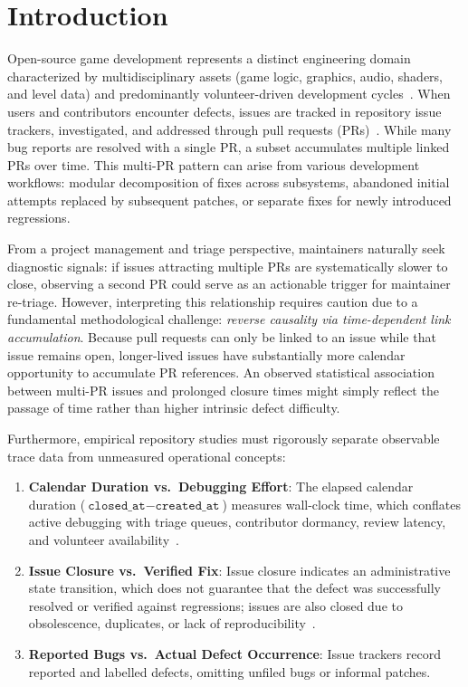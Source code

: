 \section{Introduction}\label{sec:intro}

Open-source game development represents a distinct engineering domain characterized by multidisciplinary assets (game logic, graphics, audio, shaders, and level data) and predominantly volunteer-driven development cycles~\cite{marsad2026ossgamebench}. When users and contributors encounter defects, issues are tracked in repository issue trackers, investigated, and addressed through pull requests (PRs)~\cite{gousios2014pull}. While many bug reports are resolved with a single PR, a subset accumulates multiple linked PRs over time. This multi-PR pattern can arise from various development workflows: modular decomposition of fixes across subsystems, abandoned initial attempts replaced by subsequent patches, or separate fixes for newly introduced regressions.

From a project management and triage perspective, maintainers naturally seek diagnostic signals: if issues attracting multiple PRs are systematically slower to close, observing a second PR could serve as an actionable trigger for maintainer re-triage. However, interpreting this relationship requires caution due to a fundamental methodological challenge: \emph{reverse causality via time-dependent link accumulation}. Because pull requests can only be linked to an issue while that issue remains open, longer-lived issues have substantially more calendar opportunity to accumulate PR references. An observed statistical association between multi-PR issues and prolonged closure times might simply reflect the passage of time rather than higher intrinsic defect difficulty.

Furthermore, empirical repository studies must rigorously separate observable trace data from unmeasured operational concepts:
\begin{enumerate}
  \item \textbf{Calendar Duration vs.\ Debugging Effort}: The elapsed calendar duration ($\texttt{closed\_at} - \texttt{created\_at}$) measures wall-clock time, which conflates active debugging with triage queues, contributor dormancy, review latency, and volunteer availability~\cite{mockus2002two}.
  \item \textbf{Issue Closure vs.\ Verified Fix}: Issue closure indicates an administrative state transition, which does not guarantee that the defect was successfully resolved or verified against regressions; issues are also closed due to obsolescence, duplicates, or lack of reproducibility~\cite{herzig2013not}.
  \item \textbf{Reported Bugs vs.\ Actual Defect Occurrence}: Issue trackers record reported and labelled defects, omitting unfiled bugs or informal patches.
\end{enumerate}

